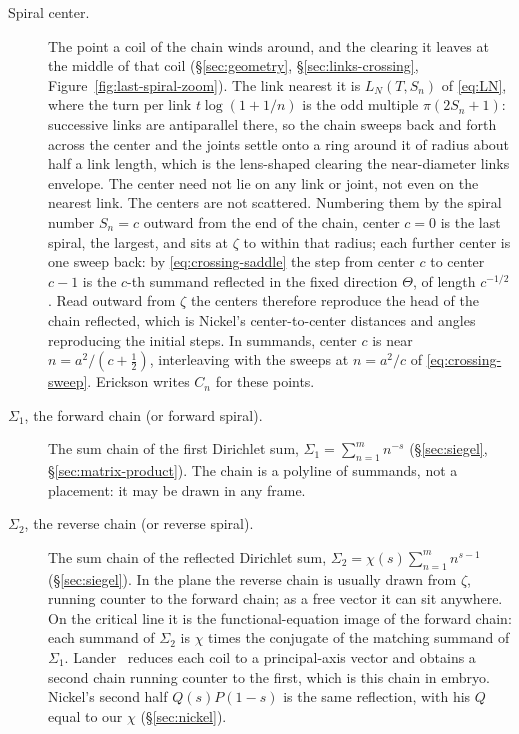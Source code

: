 \documentclass[11pt]{article}
\theoremstyle{definition}
\begin{document}
\begin{description}
\item[Spiral center.]
The point a coil of the chain winds around, and the clearing it
leaves at the middle of that coil
(\S\ref{sec:geometry}, \S\ref{sec:links-crossing},
Figure~\ref{fig:last-spiral-zoom}).
The link nearest it is $L_N(T,S_n)$ of \eqref{eq:LN}, where the turn
per link $t\log(1+1/n)$ is the odd multiple $\pi(2S_n+1)$: successive
links are antiparallel there, so the chain sweeps back and forth
across the center and the joints settle onto a ring around it of
radius about half a link length, which is the lens-shaped clearing
the near-diameter links envelope. The center need not lie on any link
or joint, not even on the nearest link.
The centers are not scattered. Numbering them by the spiral number
$S_n=c$ outward from the end of the chain, center $c=0$ is the last
spiral, the largest, and sits at $\zeta$ to within that radius; each
further center is one sweep back: by
\eqref{eq:crossing-saddle} the step from center $c$ to center $c-1$ is
the $c$-th summand reflected in the fixed direction $\Theta$, of
length $c^{-1/2}$. Read outward from $\zeta$ the centers therefore
reproduce the head of the chain reflected, which is Nickel's
center-to-center distances and angles reproducing the initial steps.
In summands, center $c$ is near $n=a^{2}/(c+\tfrac12)$, interleaving
with the sweeps at $n=a^{2}/c$ of \eqref{eq:crossing-sweep}.
Erickson writes $C_n$ for these points.

\item[$\Sigma_1$, the forward chain (or forward spiral).]
The sum chain of the first Dirichlet sum,
$\Sigma_1=\sum_{n=1}^{m}n^{-s}$
(\S\ref{sec:siegel}, \S\ref{sec:matrix-product}).
The chain is a polyline of summands, not a placement: it may be
drawn in any frame.

\item[$\Sigma_2$, the reverse chain (or reverse spiral).]
The sum chain of the reflected Dirichlet sum,
$\Sigma_2=\chi(s)\sum_{n=1}^{m}n^{s-1}$
(\S\ref{sec:siegel}).
In the plane the reverse chain is usually drawn from $\zeta$,
running counter to the forward chain; as a free vector it can sit
anywhere.
On the critical line it is the functional-equation image of the
forward chain: each summand of $\Sigma_2$ is $\chi$ times the
conjugate of the matching summand of $\Sigma_1$.
Lander~\cite{Lander2017,Lander2018} reduces each coil to a
principal-axis vector and obtains a second chain running counter to
the first, which is this chain in embryo.
Nickel's second half $Q(s)P(1-s)$ is the same reflection, with his
$Q$ equal to our $\chi$ (\S\ref{sec:nickel}).
\end{description}
\end{document}
